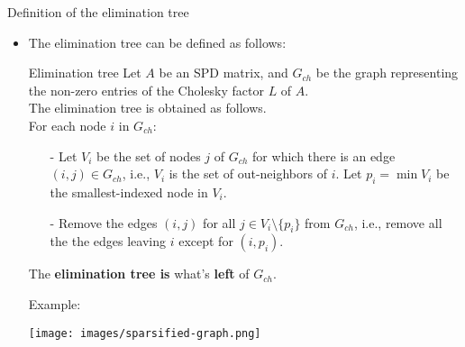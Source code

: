 \documentclass[t,usepdftitle=false]{beamer}
\begin{document}
\begin{frame}{Definition of the elimination tree}
\begin{itemize}
\item The elimination tree can be defined as follows:
\begin{block}{Elimination tree}
Let $A$ be an SPD matrix, and $G_{ch}$ be the graph representing the non-zero entries of the Cholesky factor $L$ of $A$.\vspace{.1cm}\\
The elimination tree is obtained as follows.\vspace{.1cm}\\
For each node $i$ in $G_{ch}$:\vspace{-.1cm}
\begin{itemize}
\item[-] Let $V_i$ be the set of nodes $j$ of $G_{ch}$ for which there is an edge $(i,j)\in G_{ch}$, i.e., $V_i$ is the set of out-neighbors of $i$. 
Let $p_i=\min V_i$ be the smallest-indexed node in $V_i$.\vspace{-.1cm}
\item[-] Remove the edges $(i,j)$ for all $j\in V_i\setminus \{p_i\}$ from $G_{ch}$, i.e., remove all the the edges leaving $i$ except for $(i,p_i)$.\vspace{-.1cm}
\end{itemize}
The \textbf{elimination tree is} what's \textbf{left} of $G_{ch}$.
\end{block}
Example: \vspace{-.55cm}
\begin{center}
\texttt{[image: images/sparsified-graph.png]}
\end{center}
\end{itemize}
\end{frame}
\end{document}
